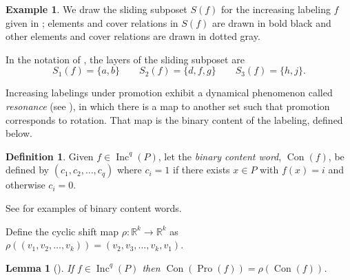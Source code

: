 \documentclass[11pt]{amsart}
\newtheorem{lemma}[theorem]{Lemma}
\theoremstyle{definition}
\newtheorem{definition}[theorem]{Definition}
\newtheorem{example}[theorem]{Example}
\DeclareMathOperator{\Inc}{\mathrm{Inc}}
\DeclareMathOperator{\Pro}{\mathrm{Pro}}
\DeclareMathOperator{\Con}{\mathrm{Con}}
\begin{document}
\begin{example}
We draw the sliding subposet $S(f)$ for the increasing labeling $f$ given in ; elements and cover relations in $S(f)$ are drawn in bold black and other elements and cover relations are drawn in dotted gray.


\begin{center}
\end{center}

In the notation of , the layers of the sliding subposet are \[
S_1(f) = \{a,b\} \qquad S_2(f) = \{d,f,g\} \qquad S_3(f) = \{h,j\}.
\]
\end{example}


Increasing labelings under promotion exhibit a dynamical phenomenon called \emph{resonance} (see \cite{dilks2017resonance}), in which there is a map to another set such that promotion corresponds to rotation. That map is the binary content of the labeling, defined below.

\begin{definition}
Given $f \in \Inc^q(P)$, let the \emph{binary content word}, $\Con(f)$, be defined by $ (c_1,c_2,\ldots,c_q)$ where $c_i = 1$ if there exists $x \in P$ with $f(x) = i$ and otherwise $c_i = 0$.
\end{definition}

See  for examples of binary content words. 

\smallskip
Define the cyclic shift map $\rho:\mathbb{R}^k\rightarrow \mathbb{R}^k$ as $\rho((v_1, v_2, \ldots, v_k))=(v_2, v_3, \ldots, v_{k},v_1)$.

\begin{lemma}[]\label{lem:ProRotateContent}
If $f \in \Inc^q(P)$ then $\Con(\Pro(f))=\rho(\Con(f))$.
\end{lemma}
\end{document}

